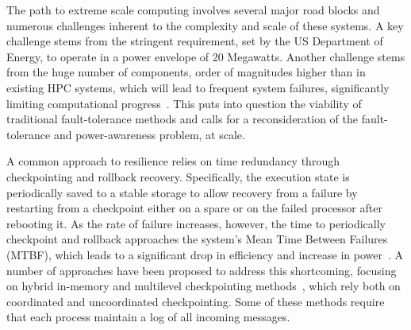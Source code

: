 
The path to extreme scale computing involves several major road blocks and numerous challenges inherent to the complexity and scale of these systems. A key challenge stems from the stringent requirement, set by the US Department of Energy, to operate in a power envelope of 20 Megawatts. Another challenge stems from the huge number of components, order of magnitudes higher than in existing HPC systems, which will lead to frequent system failures, significantly limiting computational progress~\cite{Bergman08exascalecomputing}. This puts into question the viability of traditional fault-tolerance methods and calls for a reconsideration of the fault-tolerance and power-awareness problem, at scale.

A common approach to resilience relies on time redundancy through checkpointing and rollback recovery. Specifically, the execution state is periodically saved to a stable storage to allow recovery from a failure by restarting from a checkpoint either on a spare or on the failed processor after rebooting it. As the rate of failure increases, however, the time to periodically checkpoint and rollback approaches the system's Mean Time Between Failures (MTBF), which leads to a significant drop in efficiency and increase in power~\cite{Elnozahy:02:Survey,kalaiselvi_sadhana_2000,Chandy:1985:DSD:214451.214456}. A number of approaches have been proposed to address this shortcoming, focusing on hybrid in-memory and multilevel checkpointing methods~\cite{Gao:2015:RIC:2751205.2751212}, which rely both on coordinated and uncoordinated checkpointing. Some of these methods require that each process maintain a log of all incoming messages. 

